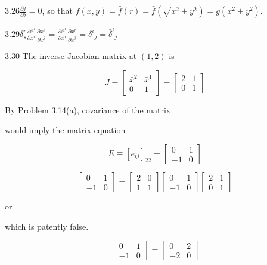 \documentclass[10pt]{article}
\begin{document}
$3.26 \frac{\partial \bar{f}}{\partial \theta}=0$, so that $f(x, y)=\bar{f}(r)=\bar{f}\left(\sqrt{x^{2}+y^{2}}\right)=g\left(x^{2}+y^{2}\right)$.

$3.29 \delta_{s}^{r} \frac{\partial \bar{x}^{i}}{\partial x^{r}} \frac{\partial x^{s}}{\partial \bar{x}^{j}}=\frac{\partial \bar{x}^{i}}{\partial x^{r}} \frac{\partial x^{r}}{\partial \bar{x}^{j}}=\delta^{i}{ }_{j}=\bar{\delta}^{i}{ }_{j}$

3.30 The inverse Jacobian matrix at $(1,2)$ is

$$
\bar{J}=\left[\begin{array}{cc}
\bar{x}^{2} & \bar{x}^{1} \\
0 & 1
\end{array}\right]=\left[\begin{array}{ll}
2 & 1 \\
0 & 1
\end{array}\right]
$$

By Problem 3.14(a), covariance of the matrix

would imply the matrix equation

$$
E \equiv\left[e_{i j}\right]_{22}=\left[\begin{array}{rr}
0 & 1 \\
-1 & 0
\end{array}\right]
$$

$$
\left[\begin{array}{rr}
0 & 1 \\
-1 & 0
\end{array}\right]=\left[\begin{array}{ll}
2 & 0 \\
1 & 1
\end{array}\right]\left[\begin{array}{rr}
0 & 1 \\
-1 & 0
\end{array}\right]\left[\begin{array}{ll}
2 & 1 \\
0 & 1
\end{array}\right]
$$

or

which is patently false.

$$
\left[\begin{array}{rr}
0 & 1 \\
-1 & 0
\end{array}\right]=\left[\begin{array}{rr}
0 & 2 \\
-2 & 0
\end{array}\right]
$$
\end{document}
